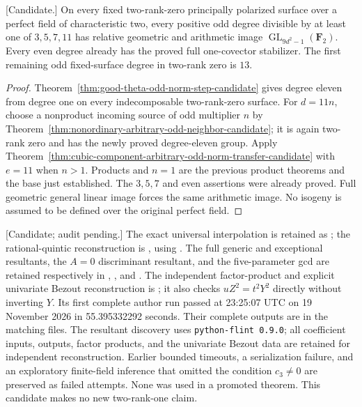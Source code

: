 \begin{corollary}
\label{cor:f0-odd-multiples-eleven-candidate}
\textup{[Candidate.]}
On every fixed two-rank-zero principally polarized surface over a perfect
field of characteristic two, every positive odd degree divisible by at
least one of $3,5,7,11$ has relative geometric and arithmetic image
$\operatorname{GL}_{9d^2-1}(\mathbf F_2)$. Every even degree already
has the proved full one-covector stabilizer. The first remaining odd
fixed-surface degree in two-rank zero is $13$.
\end{corollary}
\begin{proof}
Theorem~\ref{thm:good-theta-odd-norm-step-candidate} gives degree eleven
from degree one on every
indecomposable two-rank-zero surface. For $d=11n$, choose a nonproduct
incoming source of odd multiplier $n$ by
Theorem~\ref{thm:nonordinary-arbitrary-odd-neighbor-candidate}; it is
again two-rank zero and has the newly proved degree-eleven group.
Apply Theorem~\ref{thm:cubic-component-arbitrary-odd-norm-transfer-candidate}
with $e=11$ when $n>1$. Products and $n=1$ are the previous product
theorems and the base just established. The $3,5,7$ and even assertions
were already proved. Full geometric general linear image forces the
same arithmetic image. No isogeny is assumed to be defined over the
original perfect field.
\end{proof}

\begin{remark}
\label{rem:uniform-eleven-verification-scope-candidate}
\textup{[Candidate; audit pending.]}
The exact universal interpolation is retained as
;
the rational-quintic reconstruction is
, using
.
The full generic and exceptional resultants, the $A=0$ discriminant
resultant, and the five-parameter gcd are retained respectively in
,
, and
.
The independent factor-product and explicit univariate Bezout reconstruction
is ;
it also checks $uZ^2=t^2Y^2$ directly without inverting $Y$.
Its first complete author run passed at 23:25:07 UTC on 19 November 2026
in 55.395332292 seconds.
Their complete outputs are in the matching
 files. The resultant discovery uses
\texttt{python-flint 0.9.0}; all coefficient inputs, outputs, factor
products, and the univariate Bezout data are retained for independent
reconstruction. Earlier bounded timeouts, a serialization failure, and
an exploratory finite-field inference that omitted the condition
$c_3\ne0$ are preserved as failed attempts. None was used in a
promoted theorem. This candidate makes no new two-rank-one claim.
\end{remark}
